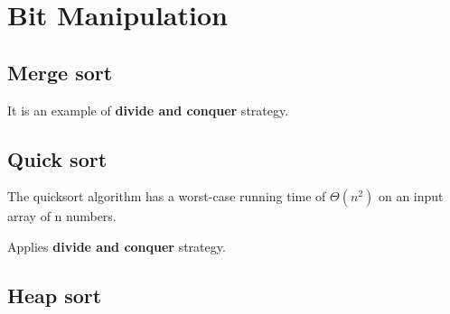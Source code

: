 \chapter{Bit Manipulation}
\section{Merge sort}

It is an example of \textbf{divide and conquer} strategy.

\section{Quick sort}
The quicksort algorithm has a worst-case running time of $\Theta(n^{2})$ on an input array of n numbers.

Applies \textbf{divide and conquer} strategy.

\section{Heap sort}